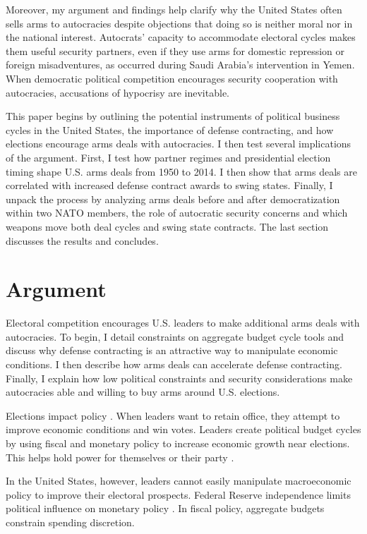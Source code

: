 \documentclass[12pt]{article}
\begin{document}
Moreover, my argument and findings help clarify why the United States often sells arms to autocracies despite objections that doing so is neither moral nor in the national interest.  
Autocrats' capacity to accommodate electoral cycles makes them useful security partners, even if they use arms for domestic repression or foreign misadventures, as occurred during Saudi Arabia's intervention in Yemen. 
When democratic political competition encourages security cooperation with autocracies, accusations of hypocrisy are inevitable. 


This paper begins by outlining the potential instruments of political business cycles in the United States, the importance of defense contracting, and how elections encourage arms deals with autocracies. 
I then test several implications of the argument. 
First, I test how partner regimes and presidential election timing shape U.S. arms deals from 1950 to 2014.
I then show that arms deals are correlated with increased defense contract awards to swing states.
Finally, I unpack the process by analyzing arms deals before and after democratization within two NATO members, the role of autocratic security concerns and which weapons move both deal cycles and swing state contracts.
The last section discusses the results and concludes.


\section{Argument}


Electoral competition encourages U.S. leaders to make additional arms deals with autocracies.
To begin, I detail constraints on aggregate budget cycle tools and discuss why defense contracting is an attractive way to manipulate economic conditions.
I then describe how arms deals can accelerate defense contracting. 
Finally, I explain how low political constraints and security considerations make autocracies able and willing to buy arms around U.S. elections.


Elections impact policy \citep{Nordhaus1975}.
When leaders want to retain office, they attempt to improve economic conditions and win votes. 
Leaders create political budget cycles by using fiscal and monetary policy to increase economic growth near elections.
This helps hold power for themselves or their party \citep{Tufte1978, Rogoff1987}. 


In the United States, however, leaders cannot easily manipulate macroeconomic policy to improve their electoral prospects.  
Federal Reserve independence limits political influence on monetary policy \citep{ClarkHallerberg2000}. 
In fiscal policy, aggregate budgets constrain spending discretion.
\end{document}
